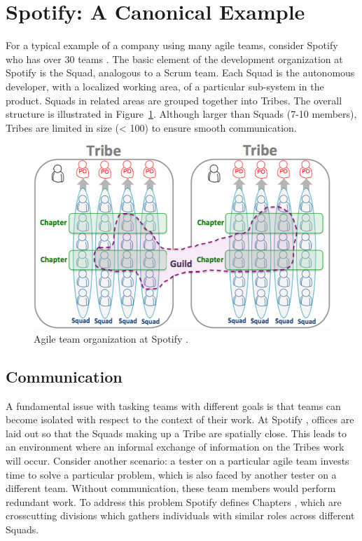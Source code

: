 ﻿\section{Spotify: A Canonical Example} 
\label{sec:spt_ex} 
For a typical example of a company using many agile teams, consider Spotify who has over 30 teams \cite{kniberg12}.
The basic element of the development organization at Spotify is the Squad, analogous to a Scrum team.
Each Squad is the autonomous developer, with a localized working area, of a particular sub-system in the product.
Squads in related areas are grouped together into Tribes. 
The overall structure is illustrated in Figure~\ref{fig:spotify_structure}.
Although larger than Squads (7-10 members), Tribes are limited in size (< 100) to ensure smooth communication.

\begin{figure}[h]
  \includegraphics[width=\linewidth]{images/kniberg12_structure.png}
  \caption{Agile team organization at Spotify \cite{kniberg12}.}
  \label{fig:spotify_structure}
\end{figure}


\subsection{Communication}
A fundamental issue with tasking teams with different goals is that teams can become isolated with respect to the context of their work.
At Spotify \cite{kniberg12}, offices are laid out so that the Squads making up a Tribe are spatially close. This leads to an environment where an informal exchange of information on the Tribes work will occur.
Consider another scenario: a tester on a particular agile team invests time to solve a particular problem, which is also faced by another tester on a different team. Without communication, these team members would perform redundant work.
To address this problem Spotify defines Chapters \cite{kniberg12}, which are crosscutting divisions which gathers individuals with similar roles across different Squads. 


